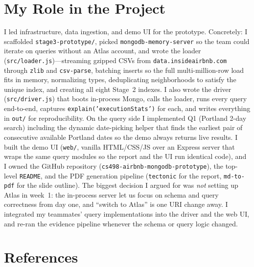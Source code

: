 \documentclass[10pt]{article}
\begin{document}
\section{My Role in the Project}

I led infrastructure, data ingestion, and demo UI for the prototype. Concretely: I scaffolded \texttt{stage3-prototype/}, picked \texttt{mongodb-memory-server} so the team could iterate on queries without an Atlas account, and wrote the loader (\texttt{src/loader.js})---streaming gzipped CSVs from \texttt{data.insideairbnb.com} through \texttt{zlib} and \texttt{csv-parse}, batching inserts so the full multi-million-row load fits in memory, normalizing types, deduplicating neighborhoods to satisfy the unique index, and creating all eight Stage~2 indexes. I also wrote the driver (\texttt{src/driver.js}) that boots in-process Mongo, calls the loader, runs every query end-to-end, captures \texttt{explain('executionStats')} for each, and writes everything in \texttt{out/} for reproducibility. On the query side I implemented Q1 (Portland 2-day search) including the dynamic date-picking helper that finds the earliest pair of consecutive available Portland dates so the demo always returns live results. I built the demo UI (\texttt{web/}, vanilla HTML/CSS/JS over an Express server that wraps the same query modules so the report and the UI run identical code), and I owned the GitHub repository (\texttt{cs498-airbnb-mongodb-prototype}), the top-level \texttt{README}, and the PDF generation pipeline (\texttt{tectonic} for the report, \texttt{md-to-pdf} for the slide outline). The biggest decision I argued for was \emph{not} setting up Atlas in week~1: the in-process server let us focus on schema and query correctness from day one, and ``switch to Atlas'' is one URI change away. I integrated my teammates' query implementations into the driver and the web UI, and re-ran the evidence pipeline whenever the schema or query logic changed.

\newpage
\section{References}
\end{document}
